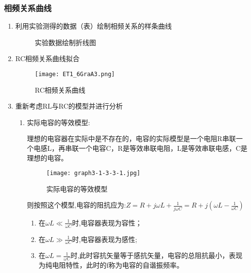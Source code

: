 \documentclass[dvipsnames, svgnames,a4paper,11pt]{article}
\begin{document}
	\subsubsection{相频关系曲线}
	\begin{enumerate}
		\item 利用实验测得的数据（表）绘制相频关系的样条曲线
		

			\begin{figure}[htbp]
				\centering
				\quad
				\quad
		
				\caption{实验数据绘制折线图}
				\label{fig:data}
			\end{figure}
		
		\item RC相频关系曲线拟合
		
		\begin{figure}[htbp]
			\centering
			\texttt{[image: ET1\_6GraA3.png]}
			\caption{RC相频关系曲线}
			\label{fig:figA3}
		\end{figure}
		
		\item 重新考虑RL与RC的模型并进行分析 

			\begin{enumerate}
				\item 实际电容的等效模型:
				
					理想的电容器在实际中是不存在的，电容的实际模型是一个电阻R串联一个电感L，再串联一个电容C，R是等效串联电阻，L是等效串联电感，C是理想的电容。

					\begin{figure}[htbp]
						\centering
						\texttt{[image: graph3-1-3-3-1.jpg]}
						\caption{实际电容的等效模型}
						\label{fig:graph3-1-3-3-1}
					\end{figure}

					则按照这个模型,电容的阻抗应为:$Z=R+j\omega L+\frac{1}{j\omega C}=R+j(\omega L-\frac{1}{\omega C})$

					\begin{enumerate}
						\item 在$\omega L\ll \frac{1}{\omega C}$时,电容器表现为容性；
						\item 在$\omega L\gg \frac{1}{\omega C}$时,电容器表现为感性;
						\item 在$\omega L =  \frac{1}{\omega C}$时,此时容抗矢量等于感抗矢量，电容的总阻抗最小，表现为纯电阻特性，此时的f称为电容的自谐振频率。
					\end{enumerate}




\end{enumerate}
\end{enumerate}
\end{document}
